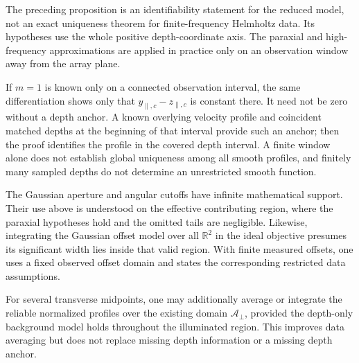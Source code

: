 \documentclass[11pt]{article}
\newcommand{\R}{\mathbb{R}}
\begin{document}
The preceding proposition is an identifiability statement for the
reduced model, not an exact uniqueness theorem for finite-frequency
Helmholtz data. Its hypotheses use the whole positive depth-coordinate
axis. The paraxial and high-frequency approximations are applied in
practice only on an observation window away from the array plane.

If $m=1$ is known only on a connected observation interval, the same
differentiation shows only that
$y_{\parallel,c}-z_{\parallel,c}$ is constant there. It need not be
zero without a depth anchor. A known overlying velocity profile and
coincident matched depths at the beginning of that interval provide
such an anchor; then the proof identifies the profile in the covered
depth interval. A finite window alone does not establish global
uniqueness among all smooth profiles, and finitely many sampled depths
do not determine an unrestricted smooth function.

The Gaussian aperture and angular cutoffs have infinite mathematical
support. Their use above is understood on the effective contributing
region, where the paraxial hypotheses hold and the omitted tails are
negligible. Likewise, integrating the Gaussian offset model over all
$\R^2$ in the ideal objective presumes its significant width lies
inside that valid region. With finite measured offsets, one uses a
fixed observed offset domain and states the corresponding restricted
data assumptions.

For several transverse midpoints, one may additionally average or
integrate the reliable normalized profiles over the existing domain
$\mathcal A_\perp$, provided the depth-only background model holds
throughout the illuminated region. This improves data averaging but
does not replace missing depth information or a missing depth anchor.
\end{document}
